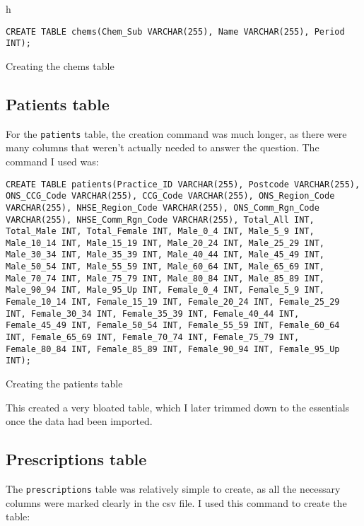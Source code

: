 \documentclass{report}
\begin{document}
\begin{listing}{h}
\begin{verbatim}
CREATE TABLE chems(Chem_Sub VARCHAR(255), Name VARCHAR(255), Period INT);
\end{verbatim}
\caption{Creating the chems table}
\label{lst: creating chems table}
\end{listing}

\subsection{Patients table}
For the \texttt{patients} table, the creation command was much longer, as there were many columns that weren't actually needed to answer the question. The command I used was:

\begin{listing}[h]
\begin{verbatim}
CREATE TABLE patients(Practice_ID VARCHAR(255), Postcode VARCHAR(255), ONS_CCG_Code VARCHAR(255), CCG_Code VARCHAR(255), ONS_Region_Code VARCHAR(255), NHSE_Region_Code VARCHAR(255), ONS_Comm_Rgn_Code VARCHAR(255), NHSE_Comm_Rgn_Code VARCHAR(255), Total_All INT, Total_Male INT, Total_Female INT, Male_0_4 INT, Male_5_9 INT, Male_10_14 INT, Male_15_19 INT, Male_20_24 INT, Male_25_29 INT, Male_30_34 INT, Male_35_39 INT, Male_40_44 INT, Male_45_49 INT, Male_50_54 INT, Male_55_59 INT, Male_60_64 INT, Male_65_69 INT, Male_70_74 INT, Male_75_79 INT, Male_80_84 INT, Male_85_89 INT, Male_90_94 INT, Male_95_Up INT, Female_0_4 INT, Female_5_9 INT, Female_10_14 INT, Female_15_19 INT, Female_20_24 INT, Female_25_29 INT, Female_30_34 INT, Female_35_39 INT, Female_40_44 INT, Female_45_49 INT, Female_50_54 INT, Female_55_59 INT, Female_60_64 INT, Female_65_69 INT, Female_70_74 INT, Female_75_79 INT, Female_80_84 INT, Female_85_89 INT, Female_90_94 INT, Female_95_Up INT);
\end{verbatim}
\caption{Creating the patients table}
\label{lst: createin patients table}
\end{listing}

This created a very bloated table, which I later trimmed down to the essentials once the data had been imported.

\subsection{Prescriptions table}
The \texttt{prescriptions} table was relatively simple to create, as all the necessary columns were marked clearly in the csv file. I used this command to create the table:
\end{document}
